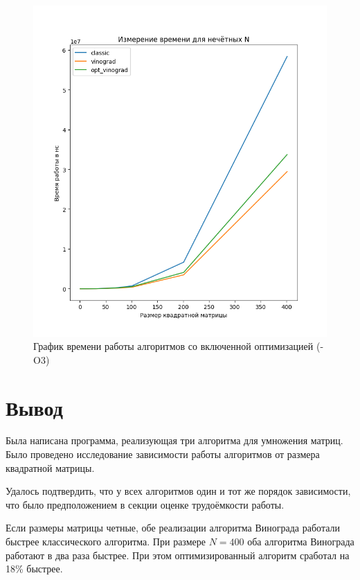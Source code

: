 \FloatBarrier
\begin{figure}[h!]
	\begin{center}
		\includegraphics[width=\linewidth]{graph/optimized_comp.png}
	\end{center}
	\caption{График времени работы алгоритмов со включенной оптимизацией (-O3)}
\end{figure}
\FloatBarrier

\section*{Вывод}
Была написана программа, реализующая три алгоритма для умножения матриц.
Было проведено исследование зависимости работы алгоритмов от размера квадратной матрицы.

Удалось подтвердить, что у всех алгоритмов один и тот же порядок зависимости, 
что было предположением в секции оценке трудоёмкости работы.

Если размеры матрицы четные, обе реализации алгоритма Винограда работали быстрее классического алгоритма.
При размере $N=400$ оба алгоритма Винограда работают в два раза быстрее. При этом оптимизированный
алгоритм сработал на 18\% быстрее.

